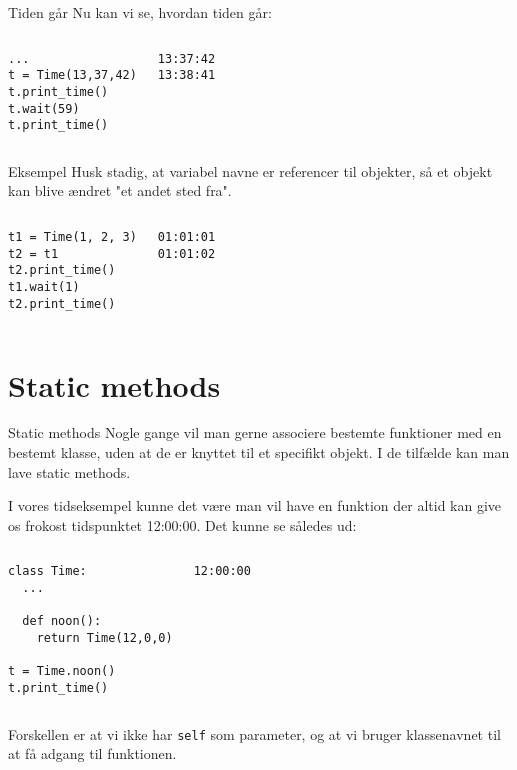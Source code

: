\documentclass[main.tex]{subfiles}
\begin{document}
\begin{frame}[fragile]{Tiden går}
Nu kan vi se, hvordan tiden går:
\begin{columns}
\begin{lstlisting}[style=python]
...
t = Time(13,37,42)
t.print_time()
t.wait(59)
t.print_time()
\end{lstlisting}
\pause
{}
\begin{lstlisting}[style=python]
13:37:42
13:38:41
\end{lstlisting}
\end{columns}
\end{frame}

\begin{frame}[fragile]{Eksempel}
Husk stadig, at variabel navne er referencer til objekter, så et objekt kan blive ændret "et andet sted fra".
\begin{columns}
	\begin{lstlisting}[style=python]
t1 = Time(1, 2, 3)
t2 = t1
t2.print_time()
t1.wait(1)
t2.print_time()
	\end{lstlisting}
	\begin{lstlisting}[style=python]
01:01:01
01:01:02
	\end{lstlisting}
\end{columns}
\end{frame}


\section{Static methods}


\begin{frame}[fragile]{Static methods}
Nogle gange vil man gerne associere bestemte funktioner med en bestemt klasse, uden at de er knyttet til et specifikt objekt. I de tilfælde kan man lave static methods.

\pause
I vores tidseksempel kunne det være man vil have en funktion der altid kan give os frokost tidspunktet 12:00:00. Det kunne se således ud:
\begin{columns}
	\begin{lstlisting}[style=python]
class Time:
  ...
  
  def noon():
    return Time(12,0,0)

t = Time.noon()
t.print_time()
	\end{lstlisting}
	
	\begin{lstlisting}[style=python]
12:00:00
	\end{lstlisting}
\end{columns}

\pause
Forskellen er at vi ikke har \texttt{self} som parameter, og at vi bruger klassenavnet til at få adgang til funktionen.

\end{frame}
\end{document}
